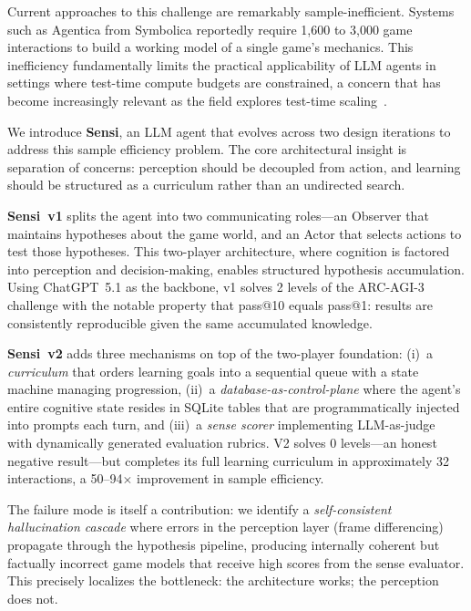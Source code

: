 \documentclass[11pt,letterpaper]{article}
\begin{document}
Current approaches to this challenge are remarkably sample-inefficient. Systems such as Agentica from Symbolica reportedly require 1,600 to 3,000 game interactions to build a working model of a single game's mechanics. This inefficiency fundamentally limits the practical applicability of LLM agents in settings where test-time compute budgets are constrained, a concern that has become increasingly relevant as the field explores test-time scaling~\citep{wei2022chain,wang2023selfconsistency,yuksekgonul2025tttdiscover}.

We introduce \textbf{Sensi}, an LLM agent that evolves across two design iterations to address this sample efficiency problem. The core architectural insight is separation of concerns: perception should be decoupled from action, and learning should be structured as a curriculum rather than an undirected search.

\textbf{Sensi~v1} splits the agent into two communicating roles---an Observer that maintains hypotheses about the game world, and an Actor that selects actions to test those hypotheses. This two-player architecture, where cognition is factored into perception and decision-making, enables structured hypothesis accumulation. Using ChatGPT~5.1 as the backbone, v1 solves 2 levels of the ARC-AGI-3 challenge with the notable property that pass@10 equals pass@1: results are consistently reproducible given the same accumulated knowledge.

\textbf{Sensi~v2} adds three mechanisms on top of the two-player foundation: (i)~a \emph{curriculum} that orders learning goals into a sequential queue with a state machine managing progression, (ii)~a \emph{database-as-control-plane} where the agent's entire cognitive state resides in SQLite tables that are programmatically injected into prompts each turn, and (iii)~a \emph{sense scorer} implementing LLM-as-judge~\citep{zheng2024judging} with dynamically generated evaluation rubrics. V2 solves 0 levels---an honest negative result---but completes its full learning curriculum in approximately 32 interactions, a 50--94$\times$ improvement in sample efficiency.

The failure mode is itself a contribution: we identify a \emph{self-consistent hallucination cascade} where errors in the perception layer (frame differencing) propagate through the hypothesis pipeline, producing internally coherent but factually incorrect game models that receive high scores from the sense evaluator. This precisely localizes the bottleneck: the architecture works; the perception does not.
\end{document}
